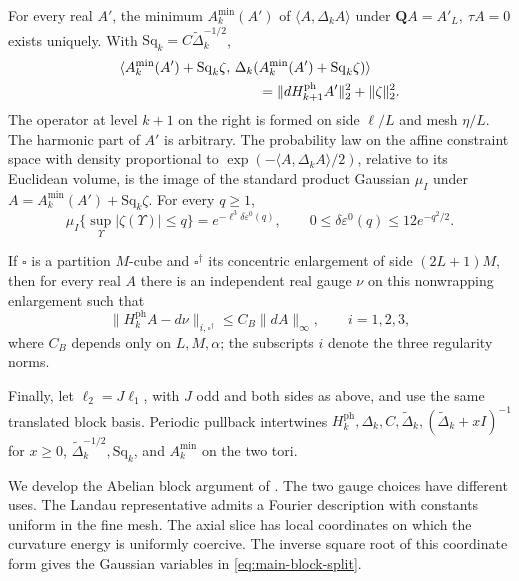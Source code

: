 \begin{theorem}
For every real \(A'\), the minimum \(A_k^{\min}(A')\) of
\(\langle A,\Delta_kA\rangle\) under
\(\mathbf QA=A'_L,\ \tau A=0\) exists uniquely. With
\(\mathrm{Sq}_k=C\widetilde\Delta_k^{-1/2}\),
\begin{equation}\label{eq:main-block-split}
 \begin{split}
 &\langle A_k^{\min}(A')+\mathrm{Sq}_k\zeta,\,
   \Delta_k(A_k^{\min}(A')+\mathrm{Sq}_k\zeta)\rangle\\
 &\hspace{35mm}=\|dH_{k+1}^{\mathrm{ph}}A'\|_2^2+\|\zeta\|_2^2.
 \end{split}
\end{equation}
The operator at level \(k+1\) on the right is formed on side
\(\ell/L\) and mesh \(\eta/L\). The harmonic part of \(A'\)
is arbitrary. The probability law on the affine constraint space
with density proportional to
\(\exp(-\langle A,\Delta_kA\rangle/2)\), relative to its Euclidean
volume, is the image of the standard product Gaussian \(\mu_I\)
under \(A=A_k^{\min}(A')+\mathrm{Sq}_k\zeta\).
For every \(q\ge1\),
\[
 \mu_I\{\sup_\Upsilon|\zeta(\Upsilon)|\le q\}
   =e^{-\ell^3\delta\varepsilon^0(q)},\qquad
 0\le\delta\varepsilon^0(q)\le12e^{-q^2/2}.
\]

If \(\square\) is a partition \(M\)-cube and
\(\square^\dagger\) its concentric enlargement of side
\((2L+1)M\), then for every real \(A\) there is an independent
real gauge \(\nu\) on this nonwrapping enlargement such that
\[
 \|H_k^{\mathrm{ph}}A-d\nu\|_{i,\square^\dagger}
       \le C_B\|dA\|_\infty,\qquad i=1,2,3,
\]
where \(C_B\) depends only on \(L,M,\alpha\); the subscripts
\(i\) denote the three regularity norms.

Finally, let \(\ell_2=J\ell_1\), with \(J\) odd and both sides
as above, and use the same translated block basis. Periodic
pullback intertwines \(H_k^{\mathrm{ph}},\Delta_k,C,
\widetilde\Delta_k,(\widetilde\Delta_k+xI)^{-1}\) for \(x\ge0\),
\(\widetilde\Delta_k^{-1/2},\mathrm{Sq}_k\), and
\(A_k^{\min}\) on the two tori.
\end{theorem}

We develop the Abelian block argument of
\cite[Section~10]{QED3Manuscript}. The two gauge choices have
different uses. The Landau representative admits a Fourier
description with constants uniform in the fine mesh. The axial
slice has local coordinates on which the curvature energy is
uniformly coercive. The inverse square root of this coordinate
form gives the Gaussian variables in \eqref{eq:main-block-split}.

